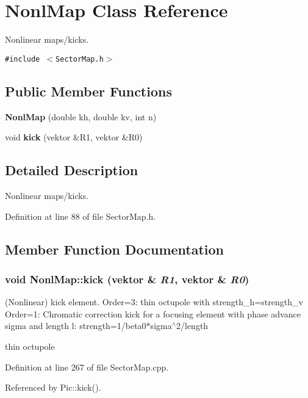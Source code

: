 \section{Nonl\-Map Class Reference}
\label{classNonlMap}
Nonlinear maps/kicks. 


{\tt \#include $<$Sector\-Map.h$>$}

\subsection*{Public Member Functions}
\begin{CompactItemize}
\item 
{\bf Nonl\-Map} (double kh, double kv, int n)\label{classNonlMap_a0}

\item 
void {\bf kick} (vektor \&R1, vektor \&R0)
\end{CompactItemize}


\subsection{Detailed Description}
Nonlinear maps/kicks.



Definition at line 88 of file Sector\-Map.h.

\subsection{Member Function Documentation}
\subsubsection{\setlength{\rightskip}{0pt plus 5cm}void Nonl\-Map::kick (vektor \& {\em R1}, vektor \& {\em R0})}\label{classNonlMap_a1}


(Nonlinear) kick element. Order=3: thin octupole with strength\_\-h=strength\_\-v Order=1: Chromatic correction kick for a focusing element with phase advance sigma and length l: strength=1/beta0$\ast$sigma$^\wedge$2/length

thin octupole 

Definition at line 267 of file Sector\-Map.cpp.

Referenced by Pic::kick().



